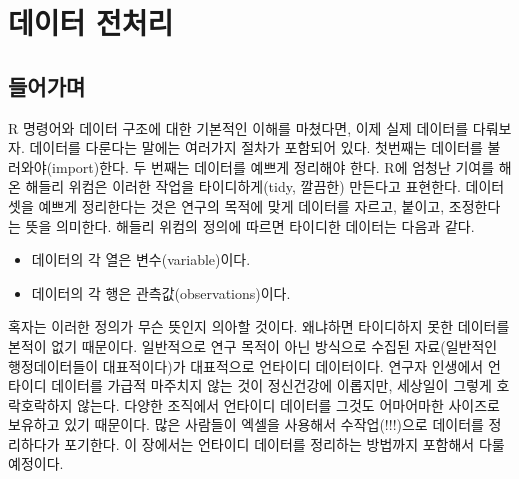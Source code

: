 \documentclass[
]{book}
\newenvironment{Shaded}{\begin{snugshade}}{\end{snugshade}}
\newcommand{\AttributeTok}[1]{\textcolor[rgb]{0.77,0.63,0.00}{#1}}
\newcommand{\CommentTok}[1]{\textcolor[rgb]{0.56,0.35,0.01}{\textit{#1}}}
\newcommand{\DecValTok}[1]{\textcolor[rgb]{0.00,0.00,0.81}{#1}}
\newcommand{\DocumentationTok}[1]{\textcolor[rgb]{0.56,0.35,0.01}{\textbf{\textit{#1}}}}
\newcommand{\FunctionTok}[1]{\textcolor[rgb]{0.00,0.00,0.00}{#1}}
\newcommand{\NormalTok}[1]{#1}
\newcommand{\SpecialCharTok}[1]{\textcolor[rgb]{0.00,0.00,0.00}{#1}}
\providecommand{\tightlist}{%
  \setlength{\itemsep}{0pt}\setlength{\parskip}{0pt}}
\theoremstyle{definition}
\theoremstyle{definition}
\theoremstyle{definition}
\theoremstyle{definition}
\theoremstyle{remark}
\begin{document}
\begin{Shaded}
\end{Shaded}

\hypertarget{literature}{%
\chapter{데이터 전처리}\label{literature}}

\hypertarget{uxb4e4uxc5b4uxac00uxba70}{%
\section{들어가며}\label{uxb4e4uxc5b4uxac00uxba70}}

R 명령어와 데이터 구조에 대한 기본적인 이해를 마쳤다면, 이제 실제 데이터를 다뤄보자. 데이터를 다룬다는 말에는 여러가지 절차가 포함되어 있다. 첫번째는 데이터를 불러와야(import)한다. 두 번째는 데이터를 예쁘게 정리해야 한다. R에 엄청난 기여를 해 온 해들리 위컴은 이러한 작업을 타이디하게(tidy, 깔끔한) 만든다고 표현한다. 데이터셋을 예쁘게 정리한다는 것은 연구의 목적에 맞게 데이터를 자르고, 붙이고, 조정한다는 뜻을 의미한다. 해들리 위컴의 정의에 따르면 타이디한 데이터는 다음과 같다.

\begin{itemize}
\tightlist
\item
  데이터의 각 열은 변수(variable)이다.
\item
  데이터의 각 행은 관측값(observations)이다.
\end{itemize}

혹자는 이러한 정의가 무슨 뜻인지 의아할 것이다. 왜냐하면 타이디하지 못한 데이터를 본적이 없기 때문이다. 일반적으로 연구 목적이 아닌 방식으로 수집된 자료(일반적인 행정데이터들이 대표적이다)가 대표적으로 언타이디 데이터이다. 연구자 인생에서 언타이디 데이터를 가급적 마주치지 않는 것이 정신건강에 이롭지만, 세상일이 그렇게 호락호락하지 않는다. 다양한 조직에서 언타이디 데이터를 그것도 어마어마한 사이즈로 보유하고 있기 때문이다. 많은 사람들이 엑셀을 사용해서 수작업(!!!)으로 데이터를 정리하다가 포기한다. 이 장에서는 언타이디 데이터를 정리하는 방법까지 포함해서 다룰 예정이다.
\end{document}
